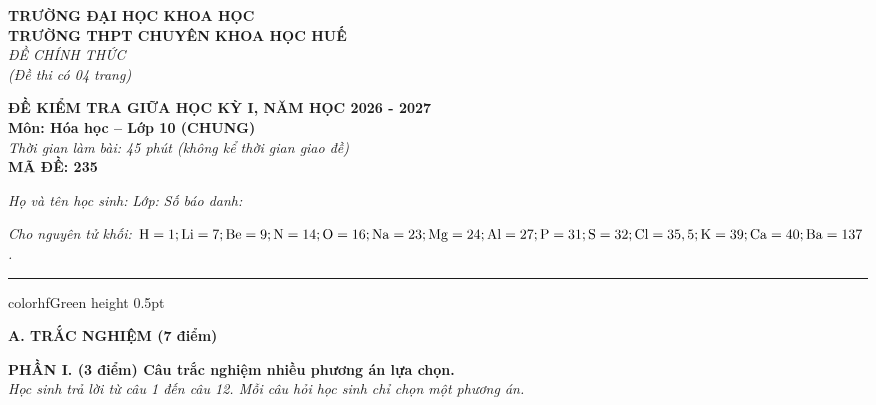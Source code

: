 \documentclass[11pt,a4paper]{article}
\begin{document}
\begin{minipage}[t]{0.48\textwidth}
\textbf{TRƯỜNG ĐẠI HỌC KHOA HỌC}\\
\textbf{TRƯỜNG THPT CHUYÊN KHOA HỌC HUẾ}\\
\textit{ĐỀ CHÍNH THỨC}\\
\textit{(Đề thi có 04 trang)}
\end{minipage}
\hfill
\begin{minipage}[t]{0.48\textwidth}
\raggedleft
\textbf{\color{hfRed}ĐỀ KIỂM TRA GIỮA HỌC KỲ I, NĂM HỌC 2026 - 2027}\\
\textbf{Môn: Hóa học -- Lớp 10 (CHUNG)}\\
\textit{Thời gian làm bài: 45 phút (không kể thời gian giao đề)}\\
\textbf{MÃ ĐỀ: 235}
\end{minipage}

\vspace{4pt}
\noindent
\textit{Họ và tên học sinh:} \dotfill \textit{Lớp:} \dotfill \textit{Số báo danh:} \dotfill

\vspace{3pt}
\noindent
\textit{\footnotesize Cho nguyên tử khối: $\ce{H}=1; \ce{Li}=7; \ce{Be}=9; \ce{N}=14; \ce{O}=16; \ce{Na}=23; \ce{Mg}=24; \ce{Al}=27; \ce{P}=31; \ce{S}=32; \ce{Cl}=35,5; \ce{K}=39; \ce{Ca}=40; \ce{Ba}=137$.}

\vspace{3pt}
\hrule color{hfGreen} height 0.5pt

\vspace{4pt}
\noindent
{\color{mainGreen}\textbf{\Large A. TRẮC NGHIỆM (7 điểm)}}

\vspace{3pt}
\noindent
{\color{mainGreen}\textbf{\large PHẦN I. (3 điểm) Câu trắc nghiệm nhiều phương án lựa chọn.}}\\
\textit{\small Học sinh trả lời từ câu 1 đến câu 12. Mỗi câu hỏi học sinh chỉ chọn một phương án.}
\vspace{2pt}
\end{document}
